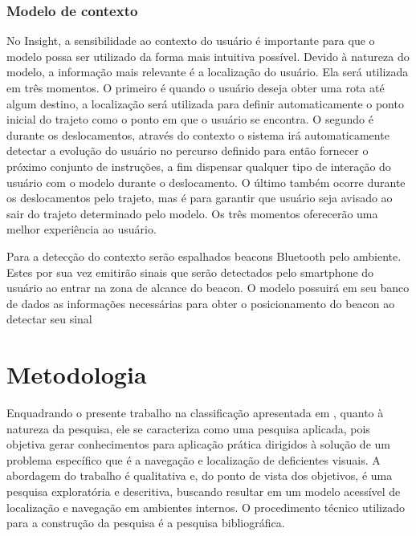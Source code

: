 \documentclass[english,brazilian]{UNISINOSmonografia}
\begin{document}

\subsection{Modelo de contexto}
No Insight, a sensibilidade ao contexto do usuário é importante para que o modelo possa ser utilizado da forma mais intuitiva possível. Devido à natureza do modelo, a informação mais relevante é a localização do usuário. Ela será utilizada em três momentos. O primeiro é quando o usuário deseja obter uma rota até algum destino, a localização será utilizada para definir automaticamente o ponto inicial do trajeto como o ponto em que o usuário se encontra. O segundo é durante os deslocamentos, através do contexto o sistema irá automaticamente detectar a evolução do usuário no percurso definido para então fornecer o próximo conjunto de instruções, a fim dispensar qualquer tipo de interação do usuário com o modelo durante o deslocamento. O último também ocorre durante os deslocamentos pelo trajeto, mas é para garantir que usuário seja avisado ao sair do trajeto determinado pelo modelo. Os três momentos oferecerão uma melhor experiência ao usuário.

Para a detecção do contexto serão espalhados beacons Bluetooth pelo ambiente. Estes por sua vez emitirão sinais que serão detectados pelo smartphone do usuário ao entrar na zona de alcance do beacon. O modelo possuirá em seu banco de dados as informações necessárias para obter o posicionamento do beacon ao detectar seu sinal


\chapter{Metodologia}

Enquadrando o presente trabalho na classificação apresentada em , quanto à natureza da pesquisa, ele se caracteriza como uma pesquisa aplicada, pois objetiva gerar conhecimentos para aplicação prática dirigidos à solução de um problema específico que é a navegação e localização de deficientes visuais. A abordagem do trabalho é qualitativa e, do ponto de vista dos objetivos, é uma pesquisa exploratória e descritiva, buscando resultar em um modelo acessível de localização e navegação em ambientes internos. O procedimento técnico utilizado para a construção da pesquisa é a pesquisa bibliográfica.
\end{document}
